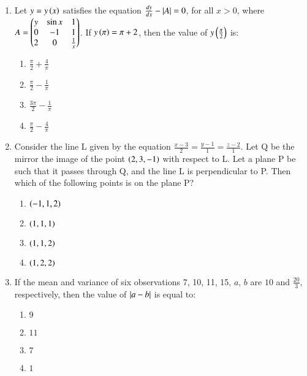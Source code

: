\documentclass[journal,9pt,onecolumn]{IEEEtran}
\begin{document}
\begin{enumerate}
    \item Let $y=y\left(x\right)$ satisfies the equation $\frac{dy}{dx}-\left\vert A\right\vert=0$, for all $x>0$, where $A=\begin{pmatrix}y&\sin x & 1 \\ 0 & -1 & 1 \\ 2 & 0 & \frac{1}{x}\end{pmatrix}$. If $y\left(\pi\right)=\pi+2$, then the value of $y\left(\frac{\pi}{2}\right)$ is:

        \begin{multicols}{4}
            \begin{enumerate}
                \item $\frac{\pi}{2}+\frac{4}{\pi}$
                \item $\frac{\pi}{2}-\frac{1}{\pi}$
                \item $\frac{3\pi}{2}-\frac{1}{\pi}$
                \item $\frac{\pi}{2}-\frac{4}{\pi}$
            \end{enumerate}
        \end{multicols}

    \item Consider the line L given by the equation $\frac{x-3}{2}=\frac{y-1}{1}=\frac{z-2}{1}$. Let Q be the mirror the image of the point $\left(2,3,-1\right)$ with respect to L. Let a plane P be such that it passes through Q, and the line L is perpendicular to P. Then which of the following points is on the plane P?

    \begin{multicols}{2}
        \begin{enumerate}
            \item $\left(-1, 1, 2\right)$
            \item $\left(1, 1, 1\right)$
            \item $\left(1, 1, 2\right)$
            \item $\left(1, 2, 2\right)$
        \end{enumerate}
    \end{multicols}

    \item If the mean and variance of six observations 7, 10, 11, 15, $a$, $b$ are $10$ and $\frac{20}{3}$, respectively, then the value of $\left\vert a-b\right\vert$ is equal to:

    \begin{multicols}{4}
        \begin{enumerate}
            \item $9$
            \item $11$
            \item $7$
            \item $1$
        \end{enumerate}
    \end{multicols}
        
\end{enumerate}
\end{document}
